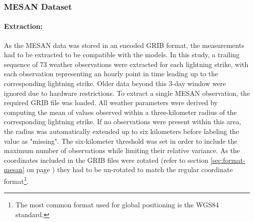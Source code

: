 \subsubsection{MESAN Dataset}
\label{sec:preprocessing-mesan}

\paragraph{Extraction:}
\label{sec:preprocessing-mesan-extraction}
As the MESAN data was stored in an encoded GRIB format, the measurements had to be extracted to be compatible with the models. In this study, a trailing sequence of 73 weather observations were extracted for each lightning strike, with each observation representing an hourly point in time leading up to the corresponding lightning strike. Older data beyond this 3-day window were ignored due to hardware restrictions. To extract a single MESAN observation, the required GRIB file was loaded. All weather parameters were derived by computing the mean of values observed within a three-kilometer radius of the corresponding lightning strike. If no observations were present within this area, the radius was automatically extended up to six kilometers before labeling the value as "missing". The six-kilometer threshold was set in order to include the maximum number of observations while limiting their relative variance. As the coordinates included in the GRIB files were rotated (refer to section \ref{sec:format-mesan} on page \pageref{sec:format-mesan}) they had to be un-rotated to match the regular coordinate format\footnote{The most common format used for global positioning is the WGS84 standard.}.


